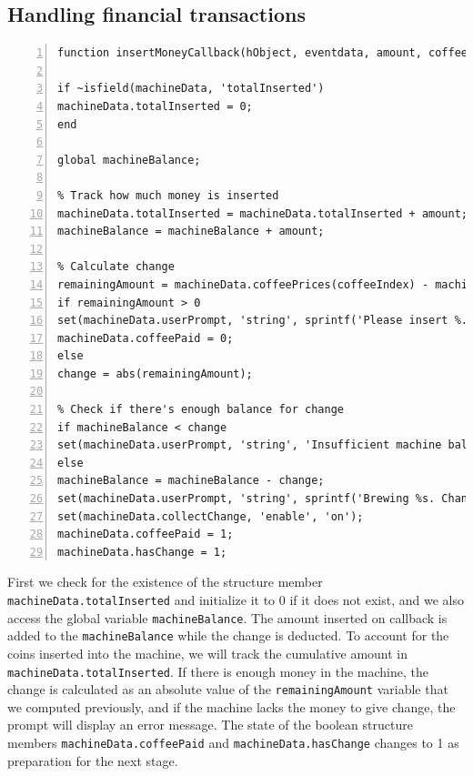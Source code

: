 \documentclass[a4paper, 11pt]{article}
\begin{document}
\subsection{Handling financial transactions}
\begin{lstlisting}[style=Matlab-editor, numbers = left, frame = single]
function insertMoneyCallback(hObject, eventdata, amount, coffeeIndex, mainFrame, miniWindow)

if ~isfield(machineData, 'totalInserted')
machineData.totalInserted = 0;
end

global machineBalance;

% Track how much money is inserted
machineData.totalInserted = machineData.totalInserted + amount;
machineBalance = machineBalance + amount;

% Calculate change
remainingAmount = machineData.coffeePrices(coffeeIndex) - machineData.totalInserted;
if remainingAmount > 0
set(machineData.userPrompt, 'string', sprintf('Please insert %.2f more.', abs(remainingAmount)));
machineData.coffeePaid = 0;
else
change = abs(remainingAmount);

% Check if there's enough balance for change
if machineBalance < change
set(machineData.userPrompt, 'string', 'Insufficient machine balance to provide change.');
else
machineBalance = machineBalance - change;
set(machineData.userPrompt, 'string', sprintf('Brewing %s. Change: %.2f.', machineData.coffeeTypes{coffeeIndex}, change));
set(machineData.collectChange, 'enable', 'on');
machineData.coffeePaid = 1;
machineData.hasChange = 1;
\end{lstlisting}
\vspace{5mm}
\noindent First we check for the existence of the structure member \texttt{machineData.totalInserted} and initialize it to 0 if it does not exist, and we also access the global variable \texttt{machineBalance}. The amount inserted on callback is added to the \texttt{machineBalance} while the change is deducted. To account for the coins inserted into the machine, we will track the cumulative amount in \texttt{machineData.totalInserted}. If there is enough money in the machine, the change is calculated as an absolute value of the \texttt{remainingAmount} variable that we computed previously, and if the machine lacks the money to give change, the prompt will display an error message. The state of the boolean structure members \texttt{machineData.coffeePaid} and \texttt{machineData.hasChange} changes to 1 as preparation for the next stage.
\vspace{5mm}
\end{document}
